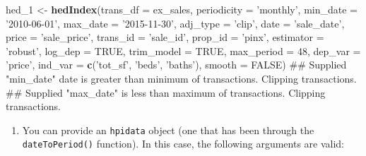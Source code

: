 \documentclass[]{article}
\newenvironment{Shaded}{\begin{snugshade}}{\end{snugshade}}
\newcommand{\KeywordTok}[1]{\textcolor[rgb]{0.13,0.29,0.53}{\textbf{#1}}}
\newcommand{\DataTypeTok}[1]{\textcolor[rgb]{0.13,0.29,0.53}{#1}}
\newcommand{\DecValTok}[1]{\textcolor[rgb]{0.00,0.00,0.81}{#1}}
\newcommand{\StringTok}[1]{\textcolor[rgb]{0.31,0.60,0.02}{#1}}
\newcommand{\OtherTok}[1]{\textcolor[rgb]{0.56,0.35,0.01}{#1}}
\newcommand{\NormalTok}[1]{#1}
\providecommand{\tightlist}{%
  \setlength{\itemsep}{0pt}\setlength{\parskip}{0pt}}
\begin{document}
\begin{Shaded}
\begin{Highlighting}[]
\NormalTok{  hed_}\DecValTok{1}\NormalTok{ <-}\StringTok{ }\KeywordTok{hedIndex}\NormalTok{(}\DataTypeTok{trans_df =}\NormalTok{ ex_sales,}
                    \DataTypeTok{periodicity =} \StringTok{'monthly'}\NormalTok{,}
                    \DataTypeTok{min_date =} \StringTok{'2010-06-01'}\NormalTok{,}
                    \DataTypeTok{max_date =} \StringTok{'2015-11-30'}\NormalTok{,}
                    \DataTypeTok{adj_type =} \StringTok{'clip'}\NormalTok{,}
                    \DataTypeTok{date =} \StringTok{'sale_date'}\NormalTok{,}
                    \DataTypeTok{price =} \StringTok{'sale_price'}\NormalTok{,}
                    \DataTypeTok{trans_id =} \StringTok{'sale_id'}\NormalTok{,}
                    \DataTypeTok{prop_id =} \StringTok{'pinx'}\NormalTok{,}
                    \DataTypeTok{estimator =} \StringTok{'robust'}\NormalTok{,}
                    \DataTypeTok{log_dep =} \OtherTok{TRUE}\NormalTok{,}
                    \DataTypeTok{trim_model =} \OtherTok{TRUE}\NormalTok{,}
                    \DataTypeTok{max_period =} \DecValTok{48}\NormalTok{,}
                    \DataTypeTok{dep_var =} \StringTok{'price'}\NormalTok{,}
                    \DataTypeTok{ind_var =} \KeywordTok{c}\NormalTok{(}\StringTok{'tot_sf'}\NormalTok{, }\StringTok{'beds'}\NormalTok{, }\StringTok{'baths'}\NormalTok{),}
                    \DataTypeTok{smooth =} \OtherTok{FALSE}\NormalTok{)}
\NormalTok{## Supplied "min_date" date is greater than minimum of transactions. Clipping transactions.}
\NormalTok{## Supplied "max_date" is less than maximum of transactions. Clipping transactions.}
\end{Highlighting}
\end{Shaded}

\begin{enumerate}
\def\labelenumi{\arabic{enumi}.}
\setcounter{enumi}{1}
\tightlist
\item
  You can provide an \texttt{hpidata} object (one that has been through
  the \texttt{dateToPeriod()} function). In this case, the following
  arguments are valid:
\end{enumerate}
\end{document}

